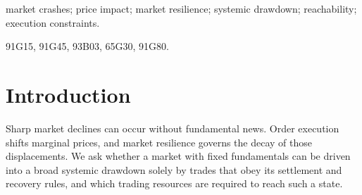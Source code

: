 \documentclass[review,hidelinks,onefignum,onetabnum]{siamonline250211}
\begin{document}
\raggedbottom
\maketitle
\begin{abstract}
We characterize structural barriers, attainable losses, and execution requirements for terminal systemic drawdowns in a deterministic multiasset market with fixed fundamentals, paired-dollar trades, and zero terminal executed-dollar flow in each asset. Under the explicitly specified price-level recovery law, a response-adapted coordinate gives sufficient elasticity thresholds: $e(S)=Sg'(S)/g(S)\ge 2$ excludes positive drawdowns under our mean-log-loss and breadth criterion, while $e(S)\ge1$ excludes a simultaneous decline of all prices. Quadratic, linear, and constant per-share responses yield distinct exclusion, inventory-bounded, and severe partial-coverage reachability regimes. The constant-response severe-loss construction relies on positive prices approaching zero and permitted instantaneous pulses; it is not an empirically calibrated crash mechanism. We derive turnover and inventory requirements, a sharp full-coverage horizon ceiling, and matching quadratic upper and lower bounds for small execution rates under finite gross execution rates. A two-session interval-certified witness places nine of ten assets at consecutive lower closing limits and attains systemic log loss above $0.020$ under specified rate and rolling-band constraints. Dimensionless resource comparisons and a nonnegative execution-cost identity clarify the economic scope of these mathematical reachability results.
\end{abstract}

\begin{keywords}market crashes; price impact; market resilience; systemic drawdown; reachability; execution constraints.\end{keywords}
\begin{MSCcodes}91G15, 91G45, 93B03, 65G30, 91G80.\end{MSCcodes}

\section{Introduction}\label{sec:intro}
Sharp market declines can occur without fundamental news. Order execution shifts marginal prices, and market resilience governs the decay of those displacements. We ask whether a market with fixed fundamentals can be driven into a broad systemic drawdown solely by trades that obey its settlement and recovery rules, and which trading resources are required to reach such a state.
\end{document}
